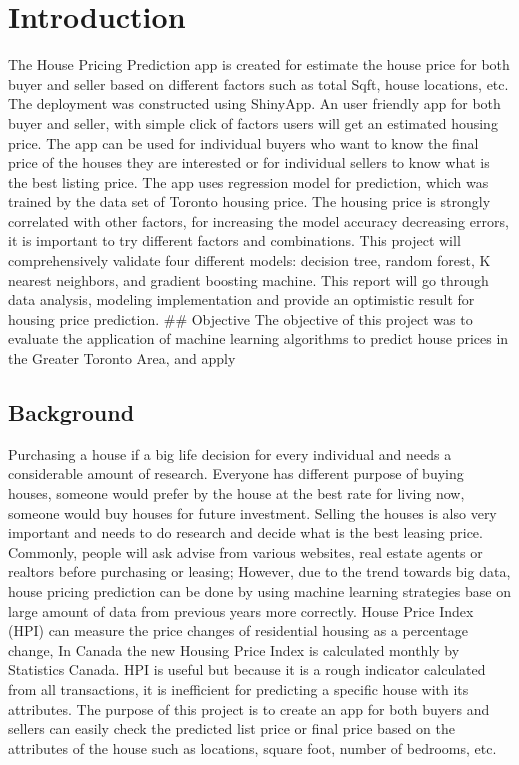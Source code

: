 \documentclass[11pt,]{article}
\begin{document}
\vskip -8.5pt



\noindent  

\hypertarget{introduction}{%
\section{Introduction}\label{introduction}}

The House Pricing Prediction app is created for estimate the house price
for both buyer and seller based on different factors such as total Sqft,
house locations, etc. The deployment was constructed using ShinyApp. An
user friendly app for both buyer and seller, with simple click of
factors users will get an estimated housing price. The app can be used
for individual buyers who want to know the final price of the houses
they are interested or for individual sellers to know what is the best
listing price. The app uses regression model for prediction, which was
trained by the data set of Toronto housing price. The housing price is
strongly correlated with other factors, for increasing the model
accuracy decreasing errors, it is important to try different factors and
combinations. This project will comprehensively validate four different
models: decision tree, random forest, K nearest neighbors, and gradient
boosting machine. This report will go through data analysis, modeling
implementation and provide an optimistic result for housing price
prediction. \#\# Objective The objective of this project was to evaluate
the application of machine learning algorithms to predict house prices
in the Greater Toronto Area, and apply

\hypertarget{background}{%
\subsection{Background}\label{background}}

Purchasing a house if a big life decision for every individual and needs
a considerable amount of research. Everyone has different purpose of
buying houses, someone would prefer by the house at the best rate for
living now, someone would buy houses for future investment. Selling the
houses is also very important and needs to do research and decide what
is the best leasing price. Commonly, people will ask advise from various
websites, real estate agents or realtors before purchasing or leasing;
However, due to the trend towards big data, house pricing prediction can
be done by using machine learning strategies base on large amount of
data from previous years more correctly. House Price Index (HPI) can
measure the price changes of residential housing as a percentage change,
In Canada the new Housing Price Index is calculated monthly by
Statistics Canada. HPI is useful but because it is a rough indicator
calculated from all transactions, it is inefficient for predicting a
specific house with its attributes. The purpose of this project is to
create an app for both buyers and sellers can easily check the predicted
list price or final price based on the attributes of the house such as
locations, square foot, number of bedrooms, etc.
\end{document}
